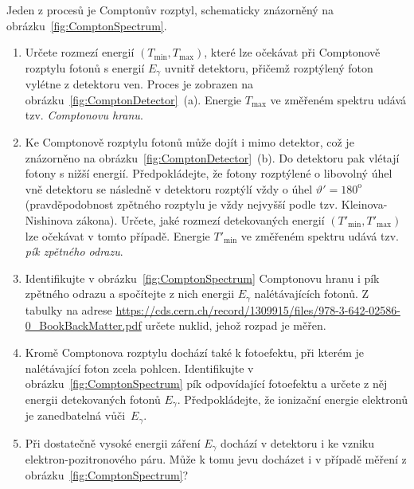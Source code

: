 \documentclass[a4paper,11pt,twoside]{article}
\newenvironment{homework}{}{}
\begin{document}
\begin{homework}
	Jeden z procesů je Comptonův rozptyl, schematicky znázorněný na obrázku~\ref{fig:ComptonSpectrum}.	
	\begin{enumerate}
		\item Určete rozmezí energií $(T_{\mathrm{min}},T_{\mathrm{max}})$, které lze očekávat při Comptonově rozptylu fotonů s energií $E_{\gamma}$ uvnitř detektoru, přičemž rozptýlený foton vylétne z detektoru ven.
		Proces je zobrazen na obrázku~\ref{fig:ComptonDetector}~(a).
		Energie $T_{\mathrm{max}}$ ve změřeném spektru udává tzv. \emph{Comptonovu hranu}.

		\item Ke Comptonově rozptylu fotonů může dojít i mimo detektor, což je znázorněno na obrázku~\ref{fig:ComptonDetector}~(b).
		Do detektoru pak vlétají fotony s nižší energií.
		Předpokládejte, že fotony rozptýlené o libovolný úhel vně detektoru se následně v detektoru rozptýlí vždy o úhel $\vartheta'=180^{\mathrm{o}}$ (pravděpodobnost zpětného rozptylu je vždy nejvyšší podle tzv. Kleinova-Nishinova zákona).
		Určete, jaké rozmezí detekovaných energií $(T'_{\mathrm{min}},T'_{\mathrm{max}})$ lze očekávat v tomto případě.
		Energie $T'_{\mathrm{min}}$ ve změřeném spektru udává tzv. \emph{pík zpětného odrazu}.

		\item Identifikujte v obrázku~\ref{fig:ComptonSpectrum} Comptonovu hranu i pík zpětného odrazu a spočítejte z nich energii $E_{\gamma}$ nalétávajících fotonů.
		Z tabulky na adrese \url{https://cds.cern.ch/record/1309915/files/978-3-642-02586-0_BookBackMatter.pdf} určete nuklid, jehož rozpad je měřen.

		\item
			Kromě Comptonova rozptylu dochází také k fotoefektu, při kterém je nalétávající foton zcela pohlcen.
			Identifikujte v obrázku~\ref{fig:ComptonSpectrum} pík odpovídající fotoefektu a určete z něj energii detekovaných fotonů $E_{\gamma}$.
			Předpokládejte, že ionizační energie elektronů je zanedbatelná vůči~$E_{\gamma}$.

		\item
		Při dostatečně vysoké energii záření $E_{\gamma}$ dochází v detektoru i ke vzniku elektron-pozitronového páru. Může k tomu jevu docházet i v případě měření z obrázku~\ref{fig:ComptonSpectrum}?
	\end{enumerate}

	\newpage
\end{homework}
\end{document}
